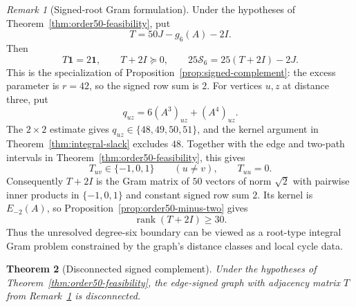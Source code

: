 \documentclass[a4paper,10pt,reqno]{amsart}
\theoremstyle{plain}
\newtheorem{theorem}{Theorem}[section]
\theoremstyle{definition}
\theoremstyle{remark}
\newtheorem{remark}[theorem]{Remark}
\newcommand{\one}{\mathbf 1}
\begin{document}
\begin{remark}[Signed-root Gram formulation]\label{rem:signed-root}
Under the hypotheses of Theorem~\ref{thm:order50-feasibility}, put
\[
 T=50J-g_6(A)-2I.
\]
Then
\[
 T\one=2\one,\qquad T+2I\succeq0,
 \qquad 25\mathcal S_6=25(T+2I)-2J.
\]
This is the specialization of Proposition~\ref{prop:signed-complement}:
the excess parameter is \(r=42\), so the signed row sum is \(2\).
For vertices \(u,z\) at distance three, put
\[
 q_{uz}=6(A^3)_{uz}+(A^4)_{uz}.
\]
The \(2\times2\) estimate gives \(q_{uz}\in\{48,49,50,51\}\), and the kernel
argument in Theorem~\ref{thm:integral-slack} excludes \(48\).  Together with
the edge and two-path intervals in Theorem~\ref{thm:order50-feasibility}, this
gives
\[
 T_{uv}\in\{-1,0,1\}\qquad(u\ne v),\qquad T_{uu}=0.
\]
 Consequently \(T+2I\) is the Gram matrix of \(50\) vectors of norm
 \(\sqrt2\) with pairwise inner products in \(\{-1,0,1\}\) and constant signed
 row sum \(2\).  Its kernel is \(E_{-2}(A)\), so
 Proposition~\ref{prop:order50-minus-two} gives
 \[
  \operatorname{rank}(T+2I)\ge30.
 \]
Thus the unresolved degree-six boundary can be viewed as a
 root-type integral Gram problem constrained by the graph's distance classes
 and local cycle data.
\end{remark}

\begin{theorem}[Disconnected signed complement]\label{thm:order50-disconnected}
Under the hypotheses of Theorem~\ref{thm:order50-feasibility}, the edge-signed
graph with adjacency matrix \(T\) from Remark~\ref{rem:signed-root} is
disconnected.
\end{theorem}
\end{document}
